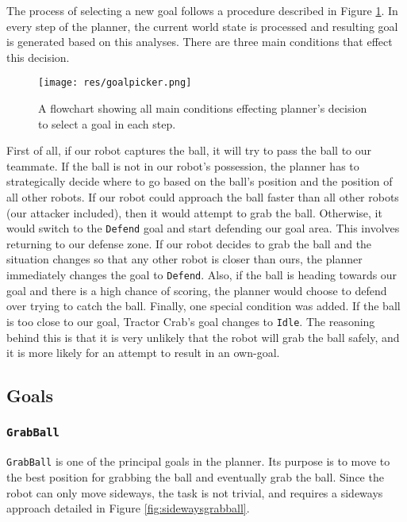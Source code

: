 The process of selecting a new goal follows a procedure described in Figure
\ref{fig:goalpicker}. In every step of the planner, the current world state is
processed and resulting goal is generated based on this analyses. There are
three main conditions that effect this decision.


\begin{figure}[H]
	\begin{center}
    \texttt{[image: res/goalpicker.png]}
    \caption{A flowchart showing all main conditions effecting planner's decision to select a goal in each step.}
    \label{fig:goalpicker}
	\end{center}
\end{figure}

\pagebreak

First of all, if our robot captures the ball, it will try to pass the ball to
our teammate. If the ball is not in our robot's possession, the planner
has to strategically decide where to go based on the ball's position and the
position of all other robots. If our robot could approach the ball faster than
all other robots (our attacker included), then it would attempt to grab the
ball. Otherwise, it would switch to the \texttt{Defend} goal and start
defending our goal area. This involves returning to our defense zone. If
our robot decides to grab the ball and the situation changes so that any
other robot is closer than ours, the planner immediately changes the goal to
\texttt{Defend}. Also, if the ball is heading towards our goal and there is a
high chance of scoring, the planner would choose to defend over trying to catch
the ball. Finally, one special condition was added. If the ball is too close to
our goal, Tractor Crab's goal changes to \texttt{Idle}. The reasoning behind
this is that it is very unlikely that the robot will grab the ball safely, and
it is more likely for an attempt to result in an own-goal.

\subsection{Goals}

\subsubsection{\texttt{GrabBall}}

\texttt{GrabBall} is one of the principal goals in the planner. Its purpose
is to move to the best position for grabbing the ball and eventually grab the
ball. Since the robot can only move sideways, the task is not trivial, and
requires a sideways approach detailed in Figure \ref{fig:sidewaysgrabball}.

